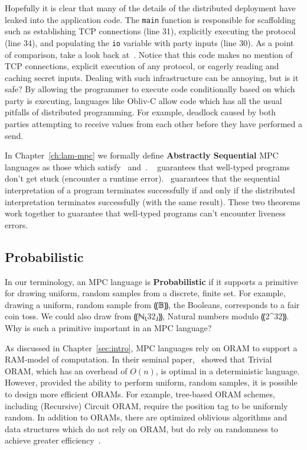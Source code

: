Hopefully it is clear that many of the details of the distributed deployment have leaked into the application code.
The \lstinline[language=c,basicstyle=\ttfamily]{main} function is responsible for scaffolding such as establishing TCP connections (line 31),
explicitly executing the protocol (line 34), and populating the \lstinline[language=c,basicstyle=\ttfamily]{io} variable with party inputs (line 30). As
a point of comparison, take a look back at~. Notice that this code makes no mention of TCP connections,
explicit execution of any protocol, or eagerly reading and caching secret inputs. Dealing with such infrastructure can be annoying, but
is it safe? By allowing the programmer to execute code conditionally based on which party is executing, languages like Obliv-C allow code
which has all the usual pitfalls of distributed programming. For example, deadlock caused by both parties attempting to receive values
from each other before they have performed a send.

In Chapter~\ref{ch:lam-mpc} we formally define \textbf{Abstractly Sequential} MPC languages as those which satisfy~ and~.
~ guarantees that well-typed \mpc programs don't get stuck (encounter a runtime error).~ guarantees
that the sequential interpretation of a program terminates successfully if and only if the distributed interpretation terminates successfully (with the same
result). These two theorems work together to guarantee that well-typed programs can't encounter liveness errors.

\subsection{Probabilistic}
\label{subsec:background-properties-probabilistic}

In our terminology, an MPC language is \textbf{Probabilistic} if it supports a primitive for drawing uniform, random samples from a
discrete, finite set. For example, drawing a uniform, random sample from ⸨𝔹⸩, the Booleans, corresponds to a fair coin toss. We
could also draw from ⸨ℕ⸤32⸥⸩, Natural numbers modulo ⸨2^{32}⸩. Why is such a primitive important in an MPC language?

As discussed in Chapter~\ref{sec:intro}, MPC languages rely on ORAM to support a RAM-model of computation. In their seminal paper,~\citet{}
showed that Trivial ORAM, which has an overhead of $O(n)$, is optimal in a deterministic language. However, provided the ability
to perform uniform, random samples, it is possible to design more efficient ORAMs. For example, tree-based ORAM schemes, including
(Recursive) Circuit ORAM, require the position tag to be uniformly random. In addition to ORAMs, there are optimized oblivious algorithms
and data structures which do not rely on ORAM, but do rely on randomness to achieve greater efficiency~\cite{}.

